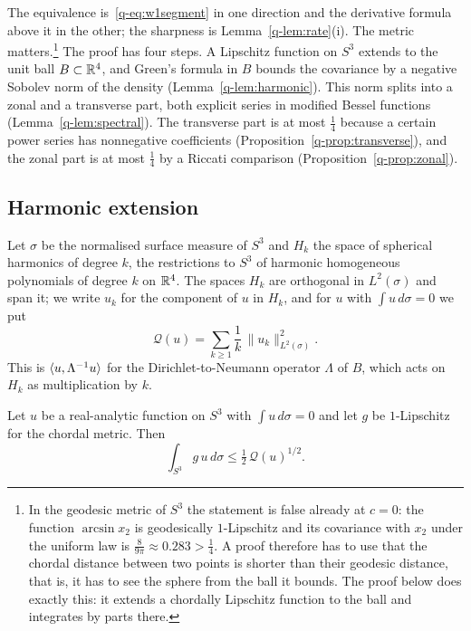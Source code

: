 The equivalence is~\eqref{q-eq:w1segment} in one direction and the derivative
formula above it in the other; the sharpness is Lemma~\ref{q-lem:rate}(i). The
metric matters.\footnote{In the geodesic metric of $S^3$ the statement is
false already at $c=0$: the function $\arcsin x_2$ is geodesically
$1$-Lipschitz and its covariance with $x_2$ under the uniform law is
$\frac8{9\pi}\approx0.283>\frac14$. A proof therefore has to use that the
chordal distance between two points is shorter than their geodesic distance,
that is, it has to see the sphere from the ball it bounds. The proof below
does exactly this: it extends a chordally Lipschitz function to the ball and
integrates by parts there.} The proof has four steps. A Lipschitz function
on $S^3$ extends to the unit ball $B\subset\mathbb{R}^4$, and Green's formula in $B$
bounds the covariance by a negative Sobolev norm of the density
(Lemma~\ref{q-lem:harmonic}). This norm splits into a zonal and a transverse
part, both explicit series in modified Bessel functions
(Lemma~\ref{q-lem:spectral}). The transverse part is at most $\frac14$ because a
certain power series has nonnegative coefficients
(Proposition~\ref{q-prop:transverse}), and the zonal part is at most $\frac14$
by a Riccati comparison (Proposition~\ref{q-prop:zonal}).

\subsection{Harmonic extension}

Let $\sigma$ be the normalised surface measure of $S^3$ and $H_k$ the space
of spherical harmonics of degree $k$, the restrictions to $S^3$ of harmonic
homogeneous polynomials of degree $k$ on $\mathbb{R}^4$. The spaces $H_k$ are
orthogonal in $L^2(\sigma)$ and span it; we write $u_k$ for the component of
$u$ in $H_k$, and for $u$ with $\int u\,d\sigma=0$ we put
\begin{equation}\label{q-eq:Qnorm}
\mathcal Q(u)=\sum_{k\ge1}\frac1k\,\|u_k\|_{L^2(\sigma)}^2 .
\end{equation}
This is $\langle u,\Lambda^{-1}u\rangle$ for the Dirichlet-to-Neumann operator
$\Lambda$ of $B$, which acts on $H_k$ as multiplication by $k$.

\begin{lemma}\label{q-lem:harmonic}
Let $u$ be a real-analytic function on $S^3$ with $\int u\,d\sigma=0$ and let
$g$ be $1$-Lipschitz for the chordal metric. Then
\[
\int_{S^3}g\,u\,d\sigma\le\tfrac12\,\mathcal Q(u)^{1/2}.
\]
\end{lemma}

